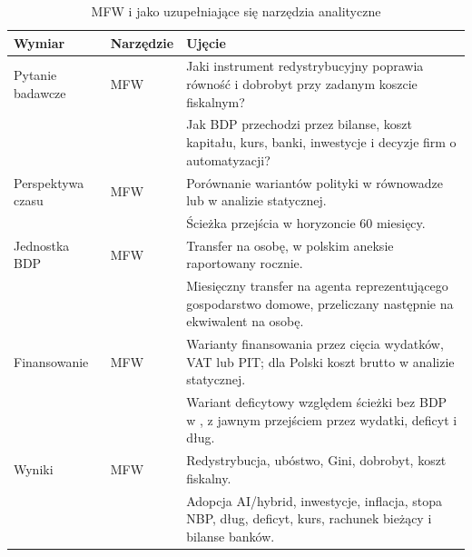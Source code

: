 \begin{table}[H]
\centering
\small
\caption{MFW i \amor{} jako uzupełniające się narzędzia analityczne}
\label{tab:mfw-vs-amor-fati}
\begin{tabularx}{\textwidth}{@{}L{0.20\textwidth}L{0.13\textwidth}>{\raggedright\arraybackslash}X@{}}
\toprule
Wymiar & Narzędzie & Ujęcie \\
\midrule
Pytanie badawcze & MFW & Jaki instrument redystrybucyjny poprawia równość i dobrobyt przy zadanym koszcie fiskalnym? \\
 & \amor{} & Jak BDP przechodzi przez bilanse, koszt kapitału, kurs, banki, inwestycje i decyzje firm o automatyzacji? \\
\addlinespace
Perspektywa czasu & MFW & Porównanie wariantów polityki w równowadze lub w analizie statycznej. \\
 & \amor{} & Ścieżka przejścia w horyzoncie 60 miesięcy. \\
\addlinespace
Jednostka BDP & MFW & Transfer na osobę, w polskim aneksie raportowany rocznie. \\
 & \amor{} & Miesięczny transfer na agenta reprezentującego gospodarstwo domowe, przeliczany następnie na ekwiwalent na osobę. \\
\addlinespace
Finansowanie & MFW & Warianty finansowania przez cięcia wydatków, VAT lub PIT; dla Polski koszt brutto w analizie statycznej. \\
 & \amor{} & Wariant deficytowy względem ścieżki bez BDP w \amor{}, z jawnym przejściem przez wydatki, deficyt i dług. \\
\addlinespace
Wyniki & MFW & Redystrybucja, ubóstwo, Gini, dobrobyt, koszt fiskalny. \\
 & \amor{} & Adopcja AI/hybrid, inwestycje, inflacja, stopa NBP, dług, deficyt, kurs, rachunek bieżący i bilanse banków. \\
\bottomrule
\end{tabularx}
\end{table}
